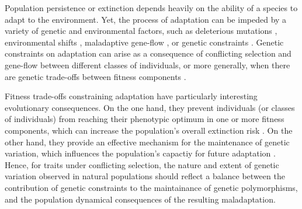 \documentclass[11pt]{article}
\begin{document}
Population persistence or extinction depends heavily on the ability of a species to adapt to the environment. Yet, the process of adaptation can be impeded by a variety of genetic and environmental factors, such as deleterious mutations \citep{Haldane1957}, environmental shifts \citep{Maynard-Smith1976, LandeShannon1996,OrrUnckless2008}, maladaptive gene-flow \citep{KirkpatrickBarton1997, BolnickNosil2007}, or genetic constraints \citep{ConnallonHall2018}. Genetic constraints on adaptation can arise as a consequence of conflicting selection and gene-flow between different classes of individuals, or more generally, when there are genetic trade-offs between fitness components \citep{CharlesworthHughes2000, ConnallonHall2018}. 



Fitness trade-offs constraining adaptation have particularly interesting evolutionary consequences. On the one hand, they prevent individuals (or classes of individuals) from reaching their phenotypic optimum in one or more fitness components, which can increase the population's overall extinction risk \citep{kokko2003sexy,harts2014demography}. On the other hand, they provide an effective mechanism for the maintenance of genetic variation, which influences the population's capactiy for future adaptation \citep{Fisher1930, CharlesworthHughes2000, ConnallonHall2018, MatthewsConnallon2019}. Hence, for traits under conflicting selection, the nature and extent of genetic variation observed in natural populations should reflect a balance between the contribution of genetic constraints to the maintainance of genetic polymorphisms, and the population dynamical consequences of the resulting maladaptation.
\end{document}
